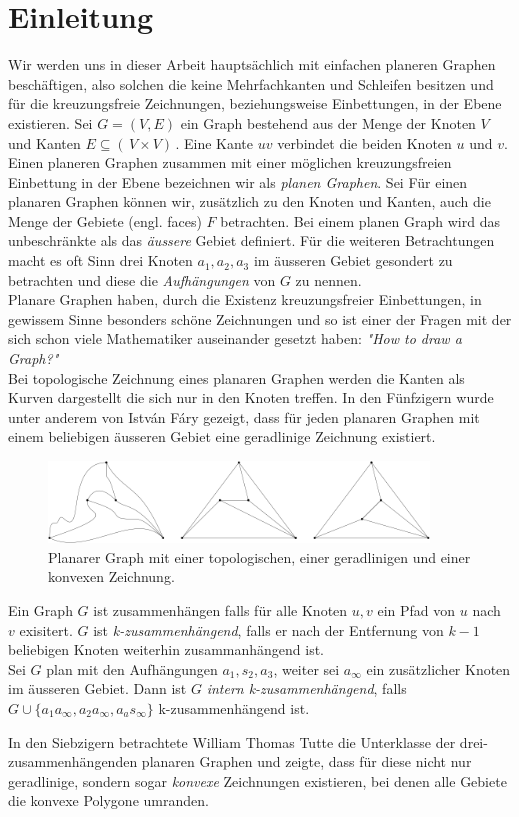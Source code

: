 \chapter{Einleitung}\label{intro}

Wir werden uns in dieser Arbeit hauptsächlich mit einfachen planeren Graphen beschäftigen, also solchen die keine Mehrfachkanten und Schleifen besitzen und für die kreuzungsfreie Zeichnungen, beziehungsweise Einbettungen, in der Ebene existieren. Sei $G = (V,E)$ ein Graph bestehend aus der Menge der Knoten $V$ und Kanten $E \subseteq ( \,V \times V ) \,$. Eine Kante $uv$ verbindet die beiden Knoten $u$ und $v$. Einen planeren Graphen zusammen mit einer möglichen kreuzungsfreien Einbettung in der Ebene bezeichnen wir als \textit{planen Graphen}. Sei Für einen planaren Graphen können wir, zusätzlich zu den Knoten und Kanten, auch die Menge der Gebiete (engl. faces) $F$ betrachten. Bei einem planen Graph wird das unbeschränkte als das \textit{äussere} Gebiet definiert. Für die weiteren Betrachtungen macht es oft Sinn drei Knoten $a_1,a_2,a_3$ im äusseren Gebiet gesondert zu betrachten und diese die \textit{Aufhängungen} von $G$ zu nennen.\\

Planare Graphen haben, durch die Existenz kreuzungsfreier Einbettungen, in gewissem Sinne besonders schöne Zeichnungen und so ist einer der Fragen mit der sich schon viele Mathematiker auseinander gesetzt haben: \textit{"How to draw a Graph?"}\cite{tutte63}\\

Bei topologische Zeichnung eines planaren Graphen werden die Kanten als Kurven dargestellt die sich nur in den Knoten treffen. In den Fünfzigern wurde unter anderem von István Fáry gezeigt, dass für jeden planaren Graphen mit einem beliebigen äusseren Gebiet eine geradlinige Zeichnung existiert. \cite{fary48}

\begin{figure}
	\centering
  \includegraphics[width=0.9\textwidth]{topo_straight_convex.png}
	\caption{Planarer Graph mit einer topologischen, einer geradlinigen und einer konvexen Zeichnung.}
\end{figure}

\begin{definition}\label{int_3_con}
Ein Graph $G$ ist zusammenhängen falls für alle Knoten $u,v$ ein Pfad von $u$ nach $v$ exisitert. $G$ ist \textit{k-zusammenhängend}, falls er nach der Entfernung von $k-1$ beliebigen Knoten weiterhin zusammanhängend ist.\\
Sei $G$ plan mit den Aufhängungen $a_1,s_2,a_3$, weiter sei $a_\infty$ ein zusätzlicher Knoten im äusseren Gebiet. Dann ist $G$ \textit{intern k-zusammenhängend}, falls $G \cup \{ a_1a_\infty,a_2a_\infty,a_as_\infty \}$ k-zusammenhängend ist. 
\end{definition}

In den Siebzigern betrachtete William Thomas Tutte die Unterklasse der drei-zusammenhängenden planaren Graphen und zeigte, dass für diese nicht nur geradlinige, sondern sogar \textit{konvexe} Zeichnungen existieren, bei denen alle Gebiete die konvexe Polygone umranden. \cite{tutte63}
